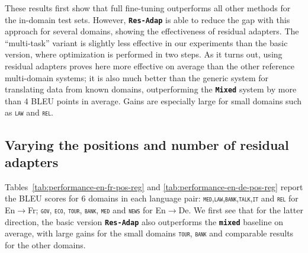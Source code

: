 \documentclass[11pt,a4paper]{article}
\newcommand{\fyFuture}[1]{\done[FY]\Todo[FY:]{\textcolor{red}{#1}}}
\newcommand{\domain}[1]{\texttt{\textsc{#1}}}
\newcommand{\system}[1]{\texttt{\textbf{#1}}}
\begin{document}
These results first show that full fine-tuning outperforms all other methods for the in-domain test sets. However, \system{Res-Adap} is able to reduce the gap with this approach for several domains, showing the effectiveness of residual adapters. The ``multi-task'' variant is slightly less effective in our experiments than the basic version, where optimization is performed in two steps. As it turns out, using residual adapters proves here more effective on average than the other reference multi-domain systems; it is also much better than the generic system for translating data from known domains, outperforming the \system{Mixed} system by more than 4 BLEU points in average. Gains are especially large for small domains such as \domain{law} and \domain{rel}.


\subsection{Varying the positions and number of residual adapters}
Tables~\ref{tab:performance-en-fr-pos-reg} and \ref{tab:performance-en-de-pos-reg} report the BLEU scores for 6 domains in each language pair: \domain{med},\domain{law},\domain{bank},\domain{talk},\domain{it} and \domain{rel} for En$\rightarrow$Fr; \domain{gov}, \domain{eco}, \domain{tour}, \domain{bank}, \domain{med} and \domain{news} for En$\rightarrow$De. We first see that for the latter direction, the basic version \system{Res-Adap} also outperforms the \system{mixed} baseline on average, with large gains for the small domains \domain{tour}, \domain{bank} and comparable results for the other domains.
\fyFuture{Full FT for en->DE ? }
\end{document}

